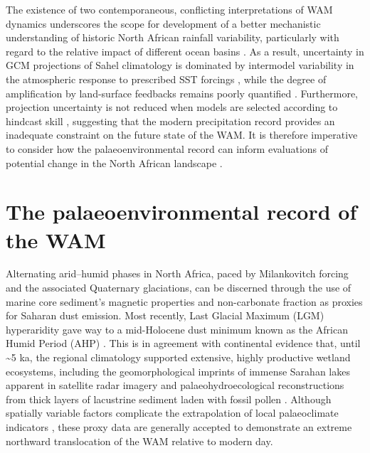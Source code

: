 \documentclass[a4paper]{article}
\begin{document}
The existence of two contemporaneous, conflicting interpretations of WAM dynamics underscores the scope for development of a better mechanistic understanding of historic North African rainfall variability, particularly with regard to the relative impact of different ocean basins \parencite{lafore2011progress, roehrig2013present, nicholson2013west, rodriguez2015variability, martin2016understanding}.
As a result, uncertainty in GCM projections of Sahel climatology is dominated by intermodel variability in the atmospheric response to prescribed SST forcings \parencite{cook2006coupled, druyan2011studies, roehrig2013present, lee2014future, chadwick2016aspects}, while the degree of amplification by land-surface feedbacks remains poorly quantified \parencite{nicholson2000land, taylor2011new}. 
Furthermore, projection uncertainty is not reduced when models are selected according to hindcast skill \parencite{rowell2016can}, suggesting that the modern precipitation record provides an inadequate constraint on the future state of the WAM.
It is therefore imperative to consider how the palaeoenvironmental record can inform evaluations of potential change in the North African landscape \parencite{braconnot2012evaluation, mohtadi2016palaeoclimatic}.

\section{The palaeoenvironmental record of the WAM}

Alternating arid--humid phases in North Africa, paced by Milankovitch forcing and the associated Quaternary glaciations, can be discerned through the use of marine core sediment's magnetic properties \parencite{bloemendal1989evidence, larrasoana2003three} and non-carbonate fraction \parencite{tiedemann1989climatic, tiedemann1994astronomic} as proxies for Saharan dust emission.
Most recently, Last Glacial Maximum (LGM) hyperaridity gave way to a mid-Holocene dust minimum known as the African Humid Period (AHP) \parencite{rea1994paleoclimatic, demenocal2000abrupt, adkins2006african}.
This is in agreement with continental evidence that, until \textasciitilde 5 ka, the regional climatology supported extensive, highly productive wetland ecosystems, including the geomorphological imprints of immense Sarahan lakes apparent in satellite radar imagery \parencite{schuster2005holocene, drake2006shorelines} and palaeohydroecological reconstructions from thick layers of lacustrine sediment laden with fossil pollen \parencite{ritchie1985sediment, lezine1990across, jolly1998biome}. 
Although spatially variable factors complicate the extrapolation of local palaeoclimate indicators \parencite{baumhauer1991palaeolakes}, these proxy data are generally accepted to demonstrate an extreme northward translocation of the WAM relative to modern day.
\end{document}
